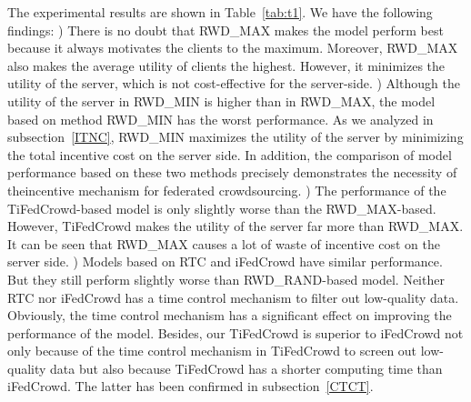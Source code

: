 \documentclass[final,1p,times]{elsarticle}
\begin{document}
\begin{table}
	\caption{Experimental results of prediction model FitRec on dataset Endomondo}
	\centering
	\label{tab:t1}
\end{table}

The experimental results are shown in Table~\ref{tab:t1}. We have the following findings: \lowercase{}) There is no doubt that RWD\_MAX makes the model perform best because it always motivates the clients to the maximum. Moreover, RWD\_MAX also makes the average utility of clients the highest. However, it minimizes the utility of the server, which is not cost-effective for the server-side. \lowercase{}) Although the utility of the server in RWD\_MIN is higher than in RWD\_MAX, the model based on method RWD\_MIN has the worst performance. As we analyzed in subsection~\ref{ITNC}, RWD\_MIN maximizes the utility of the server by minimizing the total incentive cost on the server side. In addition, the comparison of model performance based on these two methods precisely demonstrates the necessity of theincentive mechanism for federated crowdsourcing. \lowercase{}) The performance of the TiFedCrowd-based model is only slightly worse than the RWD\_MAX-based. However, TiFedCrowd makes the utility of the server far more than RWD\_MAX. It can be seen that RWD\_MAX causes a lot of waste of incentive cost on the server side. \lowercase{}) Models based on RTC and iFedCrowd \citep{kang2022incentive} have similar performance. But they still perform slightly worse than RWD\_RAND-based model. Neither RTC nor iFedCrowd has a time control mechanism to filter out low-quality data. Obviously, the time control mechanism has a significant effect on improving the performance of the model. Besides, our TiFedCrowd is superior to iFedCrowd not only because of the time control mechanism in TiFedCrowd to screen out low-quality data but also because TiFedCrowd has a shorter computing time than iFedCrowd. The latter has been confirmed in subsection~\ref{CTCT}.
\end{document}
